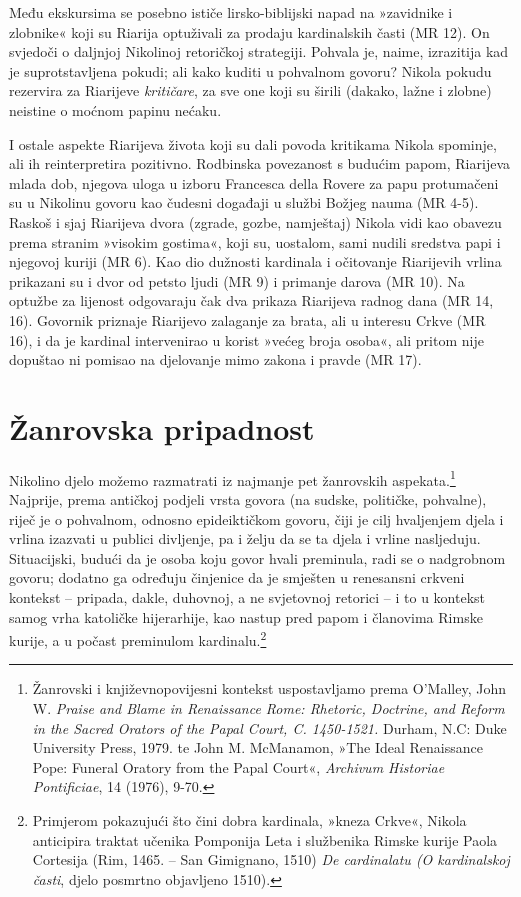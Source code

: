 \documentclass[a5paper,twoside]{article}
\begin{document}
Među ekskursima se posebno ističe lirsko-biblijski napad na »zavidnike i zlobnike« koji su Riarija optuživali za prodaju kardinalskih časti (MR 12). On svjedoči o daljnjoj Nikolinoj retoričkoj strategiji. Pohvala je, naime, izrazitija kad je suprotstavljena pokudi; ali kako kuditi u pohvalnom govoru? Nikola pokudu rezervira za Riarijeve \textit{kritičare}, za sve one koji su širili (dakako, lažne i zlobne) neistine o moćnom papinu nećaku.

I ostale aspekte Riarijeva života koji su dali povoda kritikama Nikola spominje, ali ih reinterpretira pozitivno. Rodbinska povezanost s budućim papom, Riarijeva mlada dob, njegova uloga u izboru Francesca della Rovere za papu protumačeni su u Nikolinu govoru kao čudesni događaji u službi Božjeg nauma (MR 4-5). Raskoš i sjaj Riarijeva dvora (zgrade, gozbe, namještaj) Nikola vidi kao obavezu prema stranim »visokim gostima«, koji su, uostalom, sami nudili sredstva papi i njegovoj kuriji (MR 6). Kao dio dužnosti kardinala i očitovanje Riarijevih vrlina prikazani su i dvor od petsto ljudi (MR 9) i primanje darova (MR 10). Na optužbe za lijenost odgovaraju čak dva prikaza Riarijeva radnog dana (MR 14, 16).  Govornik priznaje Riarijevo zalaganje za brata, ali u interesu Crkve (MR 16), i da je kardinal intervenirao u korist »većeg broja osoba«, ali pritom nije dopuštao ni pomisao na djelovanje mimo zakona i pravde (MR 17).


\section{Žanrovska pripadnost}

Nikolino djelo možemo razmatrati iz najmanje pet žanrovskih aspekata.\footnote{Žanrovski i književnopovijesni kontekst uspostavljamo prema O'Malley, John W. \textit{Praise and Blame in Renaissance Rome: Rhetoric, Doctrine, and Reform in the Sacred Orators of the Papal Court, C. 1450-1521.} Durham, N.C: Duke University Press, 1979. te John M. McManamon, »The Ideal Renaissance Pope: Funeral Oratory from the Papal Court«, \textit{Archivum Historiae Pontificiae}, 14 (1976), 9-70.} Najprije, prema antičkoj podjeli vrsta govora (na sudske, političke, pohvalne), riječ je o pohvalnom, odnosno epideiktičkom govoru, čiji je cilj hvaljenjem djela i vrlina izazvati u publici divljenje, pa i želju da se ta djela i vrline nasljeduju. Situacijski, budući da je osoba koju govor hvali preminula, radi se o nadgrobnom govoru; dodatno ga određuju činjenice da je smješten u renesansni crkveni kontekst – pripada, dakle, duhovnoj, a ne svjetovnoj retorici – i to u kontekst samog vrha katoličke hijerarhije, kao nastup pred papom i članovima Rimske kurije, a u počast preminulom kardinalu.\footnote{Primjerom pokazujući što čini dobra kardinala, »kneza Crkve«, Nikola anticipira traktat učenika Pomponija Leta i službenika Rimske kurije Paola Cortesija (Rim, 1465. – San Gimignano, 1510) \textit{De cardinalatu (O kardinalskoj časti}, djelo posmrtno objavljeno 1510).}
\end{document}
